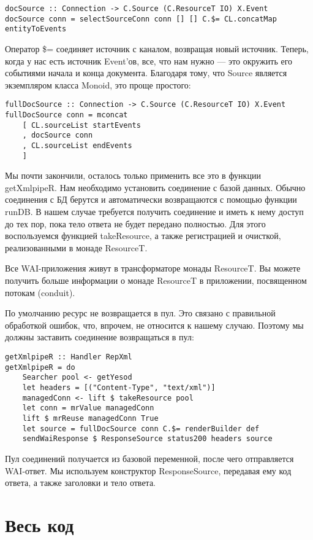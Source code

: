 \begin{lstlisting}
docSource :: Connection -> C.Source (C.ResourceT IO) X.Event
docSource conn = selectSourceConn conn [] [] C.$= CL.concatMap entityToEvents
\end{lstlisting}%

Оператор \$= соединяет источник с каналом, возвращая новый источник. Теперь, когда у нас есть источник Event'ов, все, что нам нужно --- это окружить его событиями начала и конца документа. Благодаря тому, что Source является экземпляром класса Monoid, это проще простого:

\begin{lstlisting}
fullDocSource :: Connection -> C.Source (C.ResourceT IO) X.Event
fullDocSource conn = mconcat
    [ CL.sourceList startEvents
    , docSource conn
    , CL.sourceList endEvents
    ]
\end{lstlisting}

Мы почти закончили, осталось только применить все это в функции getXmlpipeR. Нам необходимо установить соединение с базой данных. Обычно соединения с БД берутся и автоматически возвращаются с помощью функции runDB. В нашем случае требуется получить соединение и иметь к нему доступ до тех пор, пока тело ответа не будет передано полностью. Для этого воспользуемся функцией takeResource, а также регистрацией и очисткой, реализованными в монаде ResourceT.

Все WAI-приложения живут в трансформаторе монады ResourceT. Вы можете получить больше информации о монаде ResourceT в приложении, посвященном потокам (conduit).

По умолчанию ресурс не возвращается в пул. Это связано с правильной обработкой ошибок, что, впрочем, не относится к нашему случаю. Поэтому мы должны заставить соединение возвращаться в пул:

\begin{lstlisting}
getXmlpipeR :: Handler RepXml
getXmlpipeR = do
    Searcher pool <- getYesod
    let headers = [("Content-Type", "text/xml")]
    managedConn <- lift $ takeResource pool
    let conn = mrValue managedConn
    lift $ mrReuse managedConn True
    let source = fullDocSource conn C.$= renderBuilder def
    sendWaiResponse $ ResponseSource status200 headers source
\end{lstlisting}

Пул соединений получается из базовой переменной, после чего отправляется WAI-ответ. Мы используем конструктор ResponseSource, передавая ему код ответа, а также заголовки и тело ответа.

\section{Весь код} %


